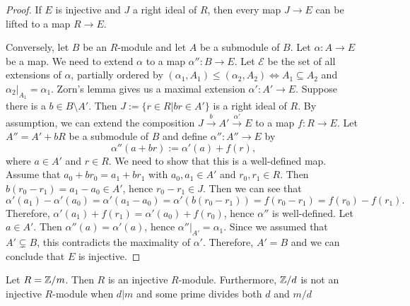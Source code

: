 \begin{proof}
	If $E$ is injective and $J$ a right ideal of $R$, then every map $J \rightarrow E$ can be lifted to a map $R \rightarrow E$.
	
	Conversely, let $B$ be an $R$-module and let $A$ be a submodule of $B$.
	Let $\alpha: A \rightarrow E$ be a map.
	We need to extend $\alpha$ to a map $\alpha'': B \rightarrow E$.
	Let $\mathcal{E}$ be the set of all extensions of $\alpha$, partially ordered by $(\alpha_1, A_1) \leq (\alpha_2, A_2) \iff A_1 \subseteq A_2$ and $\alpha_2\vert_{A_1} = \alpha_1$.
	Zorn's lemma gives us a maximal extension $\alpha': A' \rightarrow E$.
	Suppose there is a $b \in B \setminus A'$.
	Then $J := \{r \in R \vert br \in A'\}$ is a right ideal of $R$.
	By assumption, we can extend the composition $J \overset{b}{\longrightarrow} A' \overset{\alpha'}{\longrightarrow} E$ to a map $f: R \rightarrow E$.
	Let $A'' = A' + bR$ be a submodule of $B$ and define $\alpha'': A'' \rightarrow E$ by
	\[\alpha''(a + br) := \alpha'(a) + f(r),\]
	where $a \in A'$ and $r \in R$.
	We need to show that this is a well-defined map.
	Assume that $a_0 + br_0 = a_1 + br_1$ with $a_0, a_1 \in A'$ and $r_0, r_1 \in R$.
	Then $b(r_0 - r_1) = a_1 - a_0 \in A'$, hence $r_0 - r_1 \in J$.
	Then we can see that
	\[\alpha'(a_1) - \alpha'(a_0) = \alpha'(a_1 - a_0) = \alpha'(b(r_0 - r_1)) = f(r_0 - r_1) = f(r_0) - f(r_1).\]
	Therefore, $\alpha'(a_1) + f(r_1) = \alpha'(a_0) + f(r_0)$, hence $\alpha''$ is well-defined.
	Let $a \in A'$.
	Then $\alpha''(a) = \alpha'(a)$, hence $\alpha''\vert_{A'} = \alpha_1$.
	Since we assumed that $A' \subsetneq B$, this contradicts the maximality of $\alpha'$.
	Therefore, $A' = B$ and we can conclude that $E$ is injective.
\end{proof}

\begin{exercise}
	Let $R={\mathbb Z}/m$. Then $R$ is an injective $R$-module.
	Furthermore, ${\mathbb Z}/d$ is not an injective $R$-module when $d\vert m$ and some prime divides both $d$ and $m/d$
\end{exercise}

